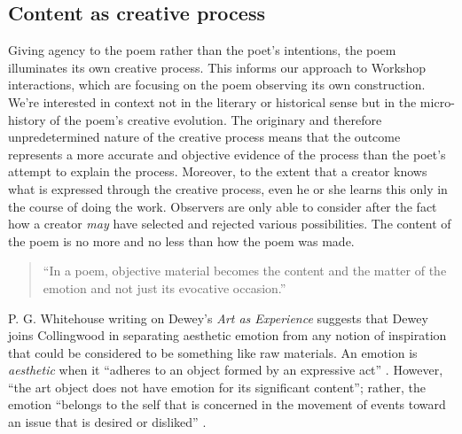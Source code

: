 
\subsection{Content as creative process}
\label{sec:philosophy_and_methods}


Giving agency to the poem rather than the poet's intentions, the poem illuminates its own creative process.  
This informs our approach to Workshop interactions,
which are focusing on the poem observing its own construction.  We're interested
in context not in the literary or historical sense but in the micro-history of the poem's creative evolution.
The originary and therefore unpredetermined nature of
the creative process means that the outcome represents a
more accurate and objective evidence of the process than
the poet's attempt to explain the process. 
Moreover, to the extent that a creator knows what is expressed through the creative process, even he or she learns this only in the course of doing the work.
Observers are only able to consider after the fact how a creator \emph{may} have selected and rejected various possibilities.   The content of the poem is no more and no less than how the poem was made.

\begin{quote}
``In a poem, objective material becomes the content and the matter of the emotion and not
just its evocative occasion.'' 
\end{quote}

P. G. Whitehouse writing on Dewey's \emph{Art as Experience} suggests that Dewey joins
Collingwood in separating aesthetic emotion from any notion of
inspiration that could be considered to be something like raw materials.  
An emotion is
\emph{aesthetic} when it ``adheres to an object formed by an expressive act''
\cite[pp. 149--156]{whitehouse1978meaning}.  However, ``the art
object does not have emotion for its significant content''; rather, the 
emotion
``belongs to the self that is concerned in the movement of events toward an issue that is desired or disliked'' 
\cite[p. 14]{dewey2005art}.%


